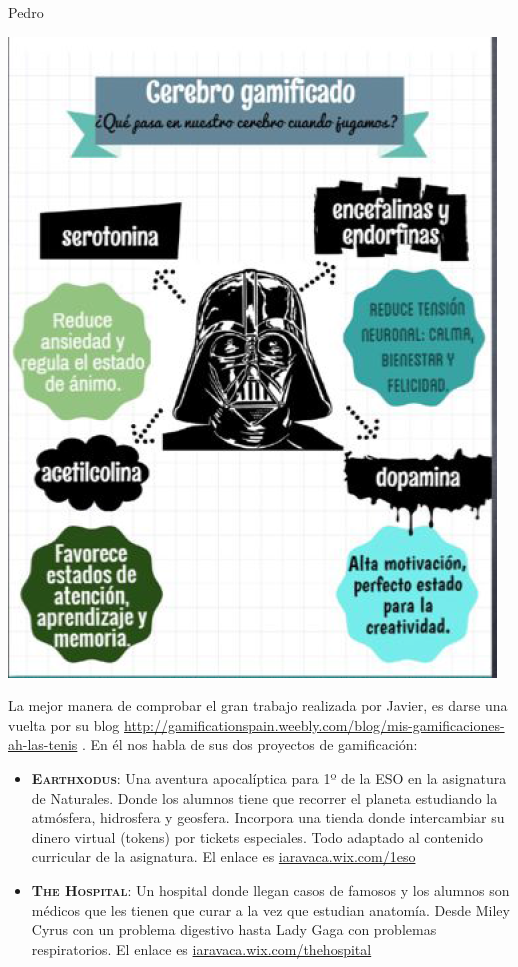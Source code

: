 \begin{opin}{\pedrocolor}{Pedro}
\begin{itemize}
\begin{minipage}[hbtp]{1.0\linewidth}
\centering
\includegraphics[scale=0.55]{img/gamingpedro4.png}
\end{minipage}
\end{itemize}


La mejor manera de comprobar el gran trabajo realizada por Javier, es darse una vuelta por su blog \url{http://gamificationspain.weebly.com/blog/mis-gamificaciones-ah-las-tenis} . En él nos habla de sus dos proyectos de gamificación:

\begin{itemize}

\item \textbf{\textsc{Earthxodus}}: Una aventura apocalíptica para 1º de la ESO en la asignatura de Naturales. Donde los alumnos tiene que recorrer el planeta estudiando la atmósfera, hidrosfera y geosfera. Incorpora una tienda donde intercambiar su dinero virtual (tokens) por tickets especiales. Todo adaptado al contenido curricular de la asignatura. El enlace es \url{iaravaca.wix.com/1eso}

\item \textbf{\textsc{The Hospital}}: Un hospital donde llegan casos de famosos y los alumnos son médicos que les tienen que curar a la vez que estudian anatomía. Desde Miley Cyrus con un problema digestivo hasta Lady Gaga con problemas respiratorios. El enlace es \url{iaravaca.wix.com/thehospital} 

\end{itemize}

\end{opin}

